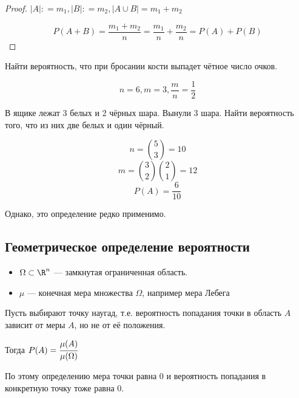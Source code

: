 \documentclass[12pt, a4paper, oneside]{book}
\begin{document}
\begin{proof}
    \(|A| : = m_1, |B| : = m_2, |A\cup B|= m_1 + m_2\)

    \[P(A + B) = \frac{m_1 + m_2}{n} = \frac{m_1}{n} + \frac{m_2}{n} = P(A) + P(B)\]
\end{proof}

\begin{example}
    Найти вероятность, что при бросании кости выпадет чётное число очков.

    \[n = 6, m = 3, \frac{m}{n} = \frac{1}{2}\]
\end{example}

\begin{example}
    В ящике лежат 3 белых и 2 чёрных шара. Вынули 3 шара. Найти вероятность того, что из них две белых и один чёрный.

    \[n = \binom{5}{3} = 10\]
    \[m = \binom{3}{2} \binom{2}{1} = 12\]
    \[P(A) = \frac{6}{10}\]
\end{example}

Однако, это определение редко применимо.

\subsection{Геометрическое определение вероятности}

\begin{definition}\itemfix
    \begin{itemize}
        \item \(\Omega \subset \R^n\) --- замкнутая ограниченная область.
        \item \(\mu\) --- конечная мера множества \(\Omega\), например мера Лебега
    \end{itemize}

    Пусть выбирают точку наугад, т.е. вероятность попадания точки в область \(A\) зависит от меры \(A\), но не от её положения.

    Тогда
    \(P(A) = \cfrac{\mu(A)}{\mu(\Omega)}\)
\end{definition}

\begin{remark}
    По этому определению мера точки равна \(0\) и вероятность попадания в конкретную точку тоже равна \(0\).
\end{remark}
\end{document}
